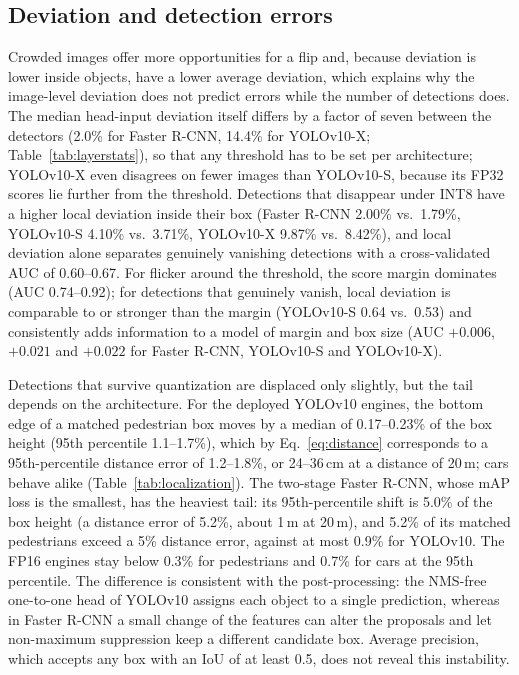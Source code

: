 \documentclass[pdflatex,sn-mathphys-num]{sn-jnl}%
\theoremstyle{thmstyleone}%
\theoremstyle{thmstyletwo}%
\theoremstyle{thmstylethree}%
\begin{document}
\begin{appendices}
\subsection{Deviation and detection errors}\label{sec:supp-res-risk}
Crowded images offer more opportunities for a flip and, because deviation is lower inside objects, have a lower average deviation, which explains why the image-level deviation does not predict errors while the number of detections does. The median head-input deviation itself differs by a factor of seven between the detectors (2.0\% for Faster R-CNN, 14.4\% for YOLOv10-X; Table~\ref{tab:layerstats}), so that any threshold has to be set per architecture; YOLOv10-X even disagrees on fewer images than YOLOv10-S, because its FP32 scores lie further from the threshold. Detections that disappear under INT8 have a higher local deviation inside their box (Faster R-CNN 2.00\% vs.\ 1.79\%, YOLOv10-S 4.10\% vs.\ 3.71\%, YOLOv10-X 9.87\% vs.\ 8.42\%), and local deviation alone separates genuinely vanishing detections with a cross-validated AUC of 0.60--0.67. For flicker around the threshold, the score margin dominates (AUC 0.74--0.92); for detections that genuinely vanish, local deviation is comparable to or stronger than the margin (YOLOv10-S 0.64 vs.\ 0.53) and consistently adds information to a model of margin and box size (AUC $+0.006$, $+0.021$ and $+0.022$ for Faster R-CNN, YOLOv10-S and YOLOv10-X).

Detections that survive quantization are displaced only slightly, but the tail depends on the architecture. For the deployed YOLOv10 engines, the bottom edge of a matched pedestrian box moves by a median of 0.17--0.23\% of the box height (95th percentile 1.1--1.7\%), which by Eq.~\eqref{eq:distance} corresponds to a 95th-percentile distance error of 1.2--1.8\%, or 24--36\,cm at a distance of 20\,m; cars behave alike (Table~\ref{tab:localization}). The two-stage Faster R-CNN, whose mAP loss is the smallest, has the heaviest tail: its 95th-percentile shift is 5.0\% of the box height (a distance error of 5.2\%, about 1\,m at 20\,m), and 5.2\% of its matched pedestrians exceed a 5\% distance error, against at most 0.9\% for YOLOv10. The FP16 engines stay below 0.3\% for pedestrians and 0.7\% for cars at the 95th percentile. The difference is consistent with the post-processing: the NMS-free one-to-one head of YOLOv10 assigns each object to a single prediction, whereas in Faster R-CNN a small change of the features can alter the proposals and let non-maximum suppression keep a different candidate box. Average precision, which accepts any box with an IoU of at least 0.5, does not reveal this instability.


\end{appendices}
\end{document}
